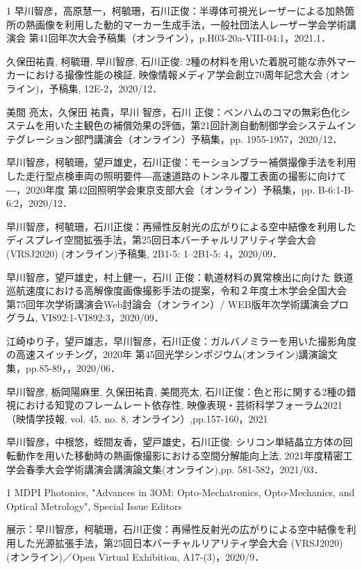 \begin{発表}{1}
早川智彦，高原慧一，柯毓珊，石川正俊：半導体可視光レーザーによる加熱箇所の熱画像を利用した動的マーカー生成手法，一般社団法人レーザー学会学術講演会 第41回年次大会予稿集（オンライン），p.H03-20a-VIII-04:1，2021.1．

久保田祐貴, 柯毓珊, 早川智彦, 石川正俊: 2種の材料を用いた着脱可能な赤外マーカーにおける撮像性能の検証, 映像情報メディア学会創立70周年記念大会 (オンライン)，予稿集, 12E-2，2020/12．

美間 亮太，久保田 祐貴，早川 智彦，石川 正俊：ベンハムのコマの無彩色化システムを用いた主観色の補償効果の評価，第21回計測自動制御学会システムインテグレーション部門講演会（オンライン）予稿集，pp. 1955-1957，2020/12．

早川智彦，柯毓珊，望戸雄史，石川正俊：モーションブラー補償撮像手法を利用した走行型点検車両の照明要件―高速道路のトンネル覆工表面の撮影に向けて―，2020年度 第42回照明学会東京支部大会（オンライン）予稿集，pp. B-6:1-B-6:2，2020/12．

早川智彦，柯毓珊，石川正俊：再帰性反射光の広がりによる空中結像を利用したディスプレイ空間拡張手法，第25回日本バーチャルリアリティ学会大会 (VRSJ2020) (オンライン)予稿集, 2B1-5: 1--2B1-5: 4，2020/09．

早川智彦，望戸雄史，村上健一，石川 正俊：軌道材料の異常検出に向けた 鉄道巡航速度における高解像度画像撮影手法の提案，令和２年度土木学会全国大会 第75回年次学術講演会Web討論会（オンライン）/ WEB版年次学術講演会プログラム, VI892:1-VI892:3，2020/09．

江崎ゆり子，望戸雄志，早川智彦，石川正俊：ガルバノミラーを用いた撮影角度の高速スイッチング，2020年 第45回光学シンポジウム(オンライン)講演論文集，pp.85-89，，2020/06．

早川智彦, 栃岡陽麻里, 久保田祐貴, 美間亮太, 石川正俊：色と形に関する2種の錯視における知覚のフレームレート依存性, 映像表現・芸術科学フォーラム2021（映情学技報, vol. 45, no. 8, オンライン）,pp.157-160，2021

早川智彦，中根悠，蛭間友香，望戸雄史，石川正俊: シリコン単結晶立方体の回転動作を用いた移動時の熱画像撮影における空間分解能向上法, 2021年度精密工学会春季大会学術講演会講演論文集(オンライン),pp. 581-582，2021/03．

\end{発表}

\begin{特記}{1}
MDPI Photonics, "Advances in 3OM: Opto-Mechatronics, Opto-Mechanics, and Optical Metrology", Special Issue Editors

展示：早川智彦，柯毓珊，石川正俊：再帰性反射光の広がりによる空中結像を利用した光源拡張手法，第25回日本バーチャルリアリティ学会大会 (VRSJ2020) (オンライン)／Open Virtual Exhibition, A17-(3)，2020/9．

\end{特記}


